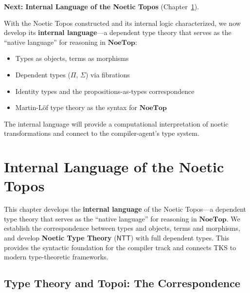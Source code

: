 \begin{remark}
\textbf{Next: Internal Language of the Noetic Topos} (Chapter~\ref{ch:internal-language}).

With the Noetic Topos constructed and its internal logic characterized, we now
develop its \textbf{internal language}---a dependent type theory that serves
as the ``native language'' for reasoning in $\mathbf{NoeTop}$:
\begin{itemize}
  \item Types as objects, terms as morphisms
  \item Dependent types ($\Pi$, $\Sigma$) via fibrations
  \item Identity types and the propositions-as-types correspondence
  \item Martin-L\"of type theory as the syntax for $\mathbf{NoeTop}$
\end{itemize}
The internal language will provide a computational interpretation of noetic
transformations and connect to the compiler-agent's type system.
\end{remark}

\chapter{Internal Language of the Noetic Topos}
\label{ch:internal-language}

\begin{tcolorbox}[colback=blue!5!white,colframe=blue!75!black,title=\vnewthree]
This chapter develops the \textbf{internal language} of the Noetic Topos---a
dependent type theory that serves as the ``native language'' for reasoning in
$\mathbf{NoeTop}$. We establish the correspondence between types and objects,
terms and morphisms, and develop \textbf{Noetic Type Theory} ($\mathsf{NTT}$)
with full dependent types. This provides the syntactic foundation for the
compiler track and connects TKS to modern type-theoretic frameworks.
\end{tcolorbox}

\section{Type Theory and Topoi: The Correspondence}
\label{sec:type-theory-topoi}

